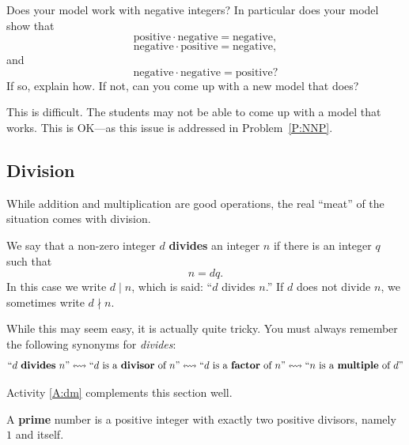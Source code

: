 \begin{question}
Does your model work with negative integers? In particular does your
model show that
\[
\text{positive}\cdot \text{negative} = \text{negative},
\]
\[
\text{negative}\cdot \text{positive} = \text{negative},
\]
and 
\[
\text{negative}\cdot \text{negative} = \text{positive}?
\]
If so, explain how. If not, can you come up with a new model that
does?
\end{question}
\QM

\begin{teachingnote}
This is difficult. The students may not be able to come up with a
model that works. This is OK---as this issue is addressed in
Problem~\ref{P:NNP}.
\end{teachingnote}


\subsection{Division} 

While addition and multiplication are good operations, the real
``meat'' of the situation comes with division.

\begin{definition}    %
We say that a non-zero integer $d$ \textbf{divides} an integer $n$ if there is
an integer $q$ such that 
\[
n = dq.
\]
In this case we write $d \mid n$, which is said: ``$d$ divides $n$.''  If $d$ does not divide $n$, 
we sometimes write $d \nmid n$.  
\end{definition}

While this may seem easy, it is actually quite tricky. You must always
remember the following synonyms for \textit{divides}:
\[\index{multiple}\index{factor}
\text{``$d$ \textbf{divides} $n$''}\leftrightsquigarrow 
\text{``$d$ is a \textbf{divisor} of $n$''}\leftrightsquigarrow
\text{``$d$ is  a \textbf{factor} of $n$''}\leftrightsquigarrow 
\text{``$n$ is a  \textbf{multiple} of $d$''}
\]

\begin{activitynote}
Activity \ref{A:dm} complements this section well.  %
\end{activitynote}

\begin{definition} 
A \textbf{prime} number is a positive integer with exactly two
positive divisors, namely $1$ and itself.
\end{definition}

